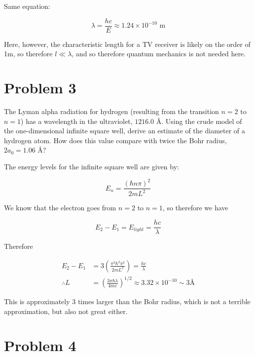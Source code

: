 \documentclass[10pt]{article}
\begin{document}
\begin{enumerate}[(a)]
        \begin{solution}
            Same equation: 

            \[ \lambda = \frac{hc}{E} \approx 1.24 \times 10^{-10} \text{ m}\]

            Here, however, the characteristic length for a TV receiver is likely on the order of 1m, so therefore $l \ll \lambda$, and so therefore quantum mechanics is not needed here.
        \end{solution}
    \end{enumerate}


    \pagebreak
    \section*{Problem 3}

    The Lyman alpha radiation for hydrogen (resulting from the transition $n = 2$ to $n = 1$) has a wavelength in the ultraviolet, $1216.0$ \AA. Using the crude model of the one-dimensional infinite square well, derive an estimate of the diameter of a hydrogen atom. How does this value compare with twice the Bohr radius, $2a_0 = 1.06$ \AA?

    \begin{solution}
        The energy levels for the infinite square well are given by: 

        \[ E_n = \frac{(\hbar n \pi)^2}{2mL^2}\] 

        We know that the electron goes from $n = 2$ to $n = 1$, so therefore we have 

        \[ E_2 - E_1 = E_{light} = \frac{hc}{\lambda}\]

        Therefore 

        \begin{align*}
            E_2 - E_1 &= 3\left(\frac{\pi^2 \hbar^2\pi^2}{2 mL^2}\right) = \frac{hc}{\lambda}\\
            \therefore L &= \left(\frac{3 \pi \hbar \lambda}{4 mc}\right)^{1/2} \approx 3.32 \times 10^{-10} \sim 3 \text{\AA}
        \end{align*}

        This is approximately 3 times larger than the Bohr radius, which is not a terrible approximation, but also not great either.
    \end{solution}
    \pagebreak
    \section*{Problem 4}
\end{document}
